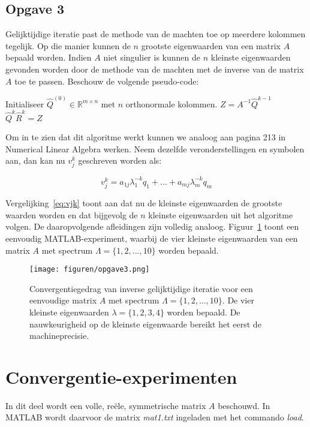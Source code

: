 \documentclass[a4paper, 12pt, titlepage]{report}
\begin{document}
\subsection{Opgave 3}
Gelijktijdige iteratie past de methode van de machten toe op meerdere kolommen tegelijk. Op die manier kunnen de $n$ grootste eigenwaarden van een matrix $A$ bepaald worden. Indien $A$ niet singulier is kunnen de $n$ kleinste eigenwaarden gevonden worden door de methode van de machten met de inverse van de matrix $A$ toe te passen. Beschouw de volgende pseudo-code:\\

\begin{algorithmic}
\STATE Initialiseer $\hat{Q}^{(0)} \in \mathbb{R}^{m \times n}$ met $n$ orthonormale kolommen.
\STATE $Z = A^{-1}\hat{Q}^{k-1}$
\STATE $\hat{Q}^{k}\hat{R}^{k} = Z$
\ENDFOR
\end{algorithmic}

Om in te zien dat dit algoritme werkt kunnen we analoog aan pagina 213 in Numerical Linear Algebra werken. Neem dezelfde veronderstellingen en symbolen aan, dan kan nu $v_{j}^{k}$ geschreven worden als:

\begin{equation}
	v_{j}^{k} = a_{1j}\lambda_{1}^{-k}q_{1} + ... + a_{mj}\lambda_{m}^{-k}q_{m}
	\label{eq:vjk}
\end{equation}

Vergelijking~\ref{eq:vjk} toont aan dat nu de kleinste eigenwaarden de grootste waarden worden en dat bijgevolg de $n$ kleinste eigenwaarden uit het algoritme volgen. De daaropvolgende afleidingen zijn volledig analoog. Figuur~\ref{fig:opgave3} toont een eenvoudig MATLAB-experiment, waarbij de vier kleinste eigenwaarden van een matrix $A$ met spectrum $\Lambda = \{ 1, 2, ..., 10\}$ worden bepaald.

\begin{figure}[htb]
	\centering
	\texttt{[image: figuren/opgave3.png]}
	\caption{Convergentiegedrag van inverse gelijktijdige iteratie voor een eenvoudige matrix $A$ met spectrum $\Lambda = \{ 1, 2, ..., 10\}$. De vier kleinste eigenwaarden $\lambda = \{ 1, 2, 3, 4\}$ worden bepaald. De nauwkeurigheid op de kleinste eigenwaarde bereikt het eerst de machineprecisie.}
	\label{fig:opgave3}
\end{figure}



\section{Convergentie-experimenten}
In dit deel wordt een volle, re\"ele, symmetrische matrix $A$ beschouwd. In MATLAB wordt daarvoor de matrix \emph{mat1.txt} ingeladen met het commando \emph{load}.
\end{document}
